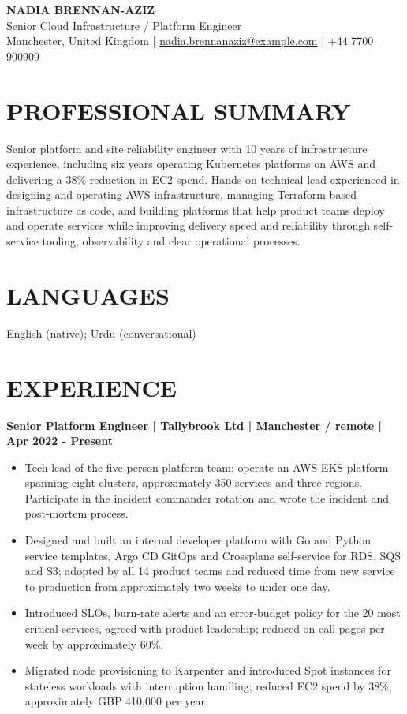 \documentclass[11pt,a4paper]{article}
\begin{document}
\begin{center}
{\Huge\bfseries\color{primarycolor} NADIA BRENNAN-AZIZ}\\[0.25em]
{\large Senior Cloud Infrastructure / Platform Engineer}\\[0.25em]
Manchester, United Kingdom | \href{mailto:nadia.brennanaziz@example.com}{nadia.brennanaziz@example.com} | +44 7700 900909
\end{center}

\section*{PROFESSIONAL SUMMARY}
Senior platform and site reliability engineer with 10 years of infrastructure experience, including six years operating Kubernetes platforms on AWS and delivering a 38\% reduction in EC2 spend. Hands-on technical lead experienced in designing and operating AWS infrastructure, managing Terraform-based infrastructure as code, and building platforms that help product teams deploy and operate services while improving delivery speed and reliability through self-service tooling, observability and clear operational processes.

\section*{LANGUAGES}
English (native); Urdu (conversational)

\section*{EXPERIENCE}
\textbf{Senior Platform Engineer | Tallybrook Ltd | Manchester / remote | Apr 2022 - Present}
\begin{itemize}
\item Tech lead of the five-person platform team; operate an AWS EKS platform spanning eight clusters, approximately 350 services and three regions. Participate in the incident commander rotation and wrote the incident and post-mortem process.
\item Designed and built an internal developer platform with Go and Python service templates, Argo CD GitOps and Crossplane self-service for RDS, SQS and S3; adopted by all 14 product teams and reduced time from new service to production from approximately two weeks to under one day.
\item Introduced SLOs, burn-rate alerts and an error-budget policy for the 20 most critical services, agreed with product leadership; reduced on-call pages per week by approximately 60\%.
\item Migrated node provisioning to Karpenter and introduced Spot instances for stateless workloads with interruption handling; reduced EC2 spend by 38\%, approximately GBP 410,000 per year.
\end{itemize}
\end{document}
